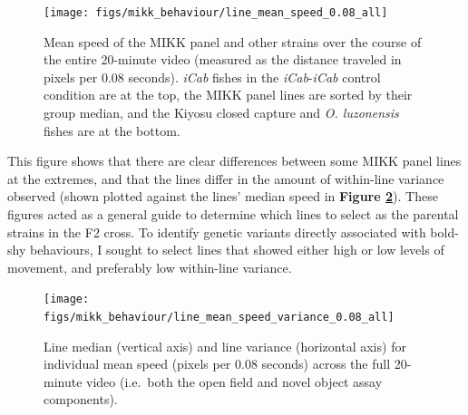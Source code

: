 \documentclass[
]{book}
\begin{document}
\begin{figure}
\texttt{[image: figs/mikk\_behaviour/line\_mean\_speed\_0.08\_all]} \caption{Mean speed of the MIKK panel and other strains over the course of the entire 20-minute video (measured as the distance traveled in pixels per 0.08 seconds). \emph{\textcolor{iCab_424B4D}{iCab}} fishes in the \emph{\textcolor{iCab_424B4D}{iCab}}-\emph{\textcolor{iCab_424B4D}{iCab}} control condition are at the top, the MIKK panel lines are sorted by their group median, and the Kiyosu closed capture and \emph{O. luzonensis} fishes are at the bottom.}\label{fig:mikk-mean-speed}
\end{figure}

This figure shows that there are clear differences between some MIKK panel lines at the extremes, and that the lines differ in the amount of within-line variance observed (shown plotted against the lines' median speed in \textbf{Figure \ref{fig:mikk-mean-speed-variance}}). These figures acted as a general guide to determine which lines to select as the parental strains in the F2 cross. To identify genetic variants directly associated with bold-shy behaviours, I sought to select lines that showed either high or low levels of movement, and preferably low within-line variance.



\begin{figure}
\texttt{[image: figs/mikk\_behaviour/line\_mean\_speed\_variance\_0.08\_all]} \caption{Line median (vertical axis) and line variance (horizontal axis) for individual mean speed (pixels per 0.08 seconds) across the full 20-minute video (i.e.~both the open field and novel object assay components).}\label{fig:mikk-mean-speed-variance}
\end{figure}
\end{document}
